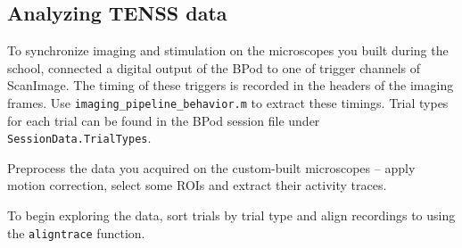 \documentclass[a4paper]{report}
\newcommand{\nexercise}[0]{\arabic{exercises}\addtocounter{exercises}{1}}
\begin{document}
\subsection{Analyzing TENSS data}
To synchronize imaging and stimulation on the microscopes you built during the school, connected a digital output of the BPod to one of trigger channels of ScanImage. 
The timing of these triggers is recorded in the headers of the imaging frames. 
Use \texttt{imaging\_pipeline\_behavior.m} to extract these timings. 
Trial types for each trial can be found in the BPod session file under \texttt{SessionData.TrialTypes}. 

\begin{exercisebox}[frametitle={Exercise \nexercise: Responses to oddball stimulus}]
Preprocess the data you acquired on the custom-built microscopes -- apply motion correction, select some ROIs and extract their activity traces. 

To begin exploring the data, sort trials by trial type and align recordings to using the \texttt{aligntrace} function.
\end{exercisebox}
\end{document}
